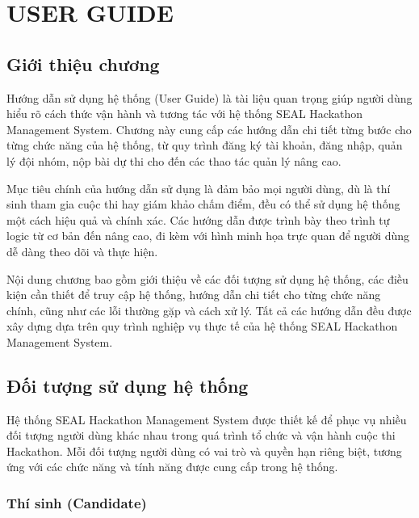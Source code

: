 ﻿%

\chapter{USER GUIDE}

\section{Giới thiệu chương}

Hướng dẫn sử dụng hệ thống (User Guide) là tài liệu quan trọng giúp người dùng hiểu rõ cách thức vận hành và tương tác với hệ thống SEAL Hackathon Management System. Chương này cung cấp các hướng dẫn chi tiết từng bước cho từng chức năng của hệ thống, từ quy trình đăng ký tài khoản, đăng nhập, quản lý đội nhóm, nộp bài dự thi cho đến các thao tác quản lý nâng cao.

Mục tiêu chính của hướng dẫn sử dụng là đảm bảo mọi người dùng, dù là thí sinh tham gia cuộc thi hay giám khảo chấm điểm, đều có thể sử dụng hệ thống một cách hiệu quả và chính xác. Các hướng dẫn được trình bày theo trình tự logic từ cơ bản đến nâng cao, đi kèm với hình minh họa trực quan để người dùng dễ dàng theo dõi và thực hiện.

Nội dung chương bao gồm giới thiệu về các đối tượng sử dụng hệ thống, các điều kiện cần thiết để truy cập hệ thống, hướng dẫn chi tiết cho từng chức năng chính, cũng như các lỗi thường gặp và cách xử lý. Tất cả các hướng dẫn đều được xây dựng dựa trên quy trình nghiệp vụ thực tế của hệ thống SEAL Hackathon Management System.


\section{Đối tượng sử dụng hệ thống}

Hệ thống SEAL Hackathon Management System được thiết kế để phục vụ nhiều đối tượng người dùng khác nhau trong quá trình tổ chức và vận hành cuộc thi Hackathon. Mỗi đối tượng người dùng có vai trò và quyền hạn riêng biệt, tương ứng với các chức năng và tính năng được cung cấp trong hệ thống.

\subsection{Thí sinh (Candidate)}

